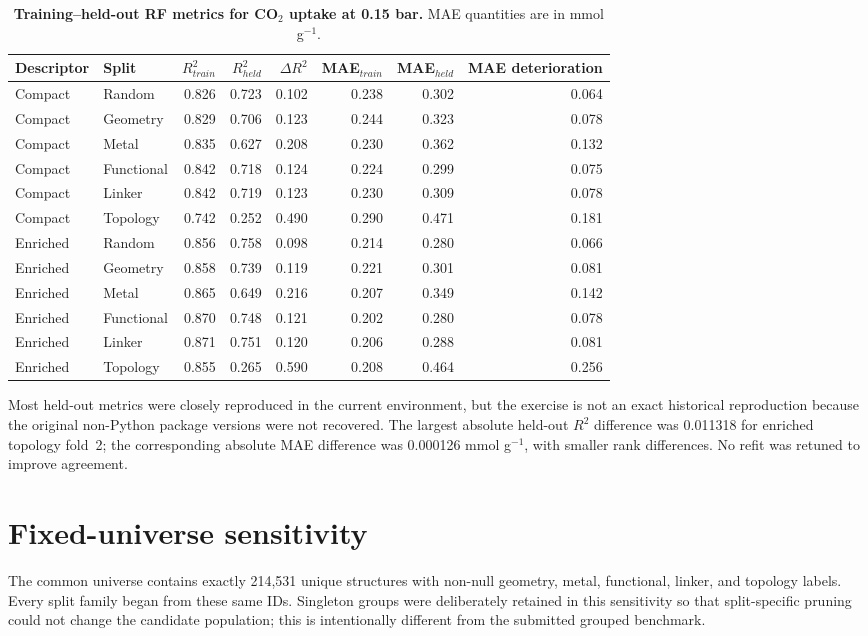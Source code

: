 \documentclass[11pt,a4paper]{article}
\begin{document}
\begin{table}[H]
\centering
\scriptsize
\caption{\textbf{Training--held-out RF metrics for CO$_2$ uptake at 0.15 bar.} MAE quantities are in mmol g$^{-1}$.}
\label{tab:generalization_gap}
\begin{tabular}{llrrrrrr}
\toprule
Descriptor & Split & $R^2_{train}$ & $R^2_{held}$ & $\Delta R^2$ & MAE$_{train}$ & MAE$_{held}$ & MAE deterioration \\
\midrule
Compact & Random & 0.826 & 0.723 & 0.102 & 0.238 & 0.302 & 0.064 \\
Compact & Geometry & 0.829 & 0.706 & 0.123 & 0.244 & 0.323 & 0.078 \\
Compact & Metal & 0.835 & 0.627 & 0.208 & 0.230 & 0.362 & 0.132 \\
Compact & Functional & 0.842 & 0.718 & 0.124 & 0.224 & 0.299 & 0.075 \\
Compact & Linker & 0.842 & 0.719 & 0.123 & 0.230 & 0.309 & 0.078 \\
Compact & Topology & 0.742 & 0.252 & 0.490 & 0.290 & 0.471 & 0.181 \\
Enriched & Random & 0.856 & 0.758 & 0.098 & 0.214 & 0.280 & 0.066 \\
Enriched & Geometry & 0.858 & 0.739 & 0.119 & 0.221 & 0.301 & 0.081 \\
Enriched & Metal & 0.865 & 0.649 & 0.216 & 0.207 & 0.349 & 0.142 \\
Enriched & Functional & 0.870 & 0.748 & 0.121 & 0.202 & 0.280 & 0.078 \\
Enriched & Linker & 0.871 & 0.751 & 0.120 & 0.206 & 0.288 & 0.081 \\
Enriched & Topology & 0.855 & 0.265 & 0.590 & 0.208 & 0.464 & 0.256 \\
\bottomrule
\end{tabular}
\end{table}

Most held-out metrics were closely reproduced in the current environment, but the exercise is not an exact historical reproduction because the original non-Python package versions were not recovered. The largest absolute held-out $R^2$ difference was 0.011318 for enriched topology fold~2; the corresponding absolute MAE difference was 0.000126 mmol g$^{-1}$, with smaller rank differences. No refit was retuned to improve agreement.

\section{Fixed-universe sensitivity}
The common universe contains exactly 214,531 unique structures with non-null geometry, metal, functional, linker, and topology labels. Every split family began from these same IDs. Singleton groups were deliberately retained in this sensitivity so that split-specific pruning could not change the candidate population; this is intentionally different from the submitted grouped benchmark.
\end{document}
